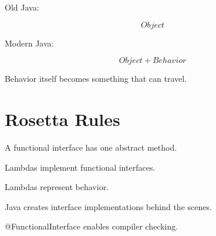 \documentclass[11pt,a4paper]{book}
\begin{document}
Old Java:

\[
Object
\]


Modern Java:

\[
Object
+
Behavior
\]


Behavior itself becomes
something that can travel.


\section{Rosetta Rules}

\begin{rosettarule}

A functional interface has one abstract method.

\end{rosettarule}


\begin{rosettarule}

Lambdas implement functional interfaces.

\end{rosettarule}


\begin{rosettarule}

Lambdas represent behavior.

\end{rosettarule}


\begin{rosettarule}

Java creates interface implementations behind the scenes.

\end{rosettarule}


\begin{rosettarule}

@FunctionalInterface enables compiler checking.

\end{rosettarule}
\end{document}
